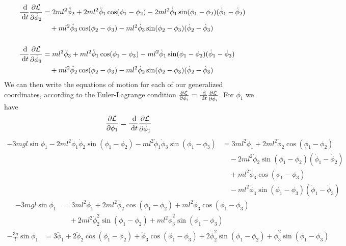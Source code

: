 \documentclass{article}
\renewcommand{\L}{\mathcal{L}}
\begin{document}
\begin{appendices}
\begin{align}
	\D{}{t}\pD{\L}{\dot\phi_2} &= 2ml^2\ddot\phi_2 
		+ 2ml^2\ddot\phi_1\cos(\phi_1-\phi_2) 
		- 2ml^2\dot\phi_1\sin(\phi_1-\phi_2)(\dot\phi_1-\dot\phi_2) \\
		&\quad + ml^2\ddot\phi_3\cos(\phi_2-\phi_3) 
		- ml^2\dot\phi_3\sin(\phi_2-\phi_3)(\dot\phi_2-\dot\phi_3) \\\\
	\D{}{t}\pD{\L}{\dot\phi_3} &= ml^2\ddot\phi_3 
		+ ml^2\ddot\phi_1\cos(\phi_1-\phi_3) 
		- ml^2\dot\phi_1\sin(\phi_1-\phi_3)(\dot\phi_1-\dot\phi_3) \\
		&\quad + ml^2\ddot\phi_2\cos(\phi_2-\phi_3) 
		- ml^2\dot\phi_2\sin(\phi_2-\phi_3)(\dot\phi_2-\dot\phi_3) 
\end{align}
We can then write the equations of motion for each of our generalized
coordinates, according to the Euler-Lagrange condition $\pD{\L}{\phi_i}
=\D{}{t}\pD{\L}{\dot\phi_i}$. For $\phi_1$ we have
\begin{align}
	\pD{\L}{\phi_1} &= \D{}{t}\pD{\L}{\dot\phi_1} 
\end{align}
\begin{align}
	-3mgl\sin\phi_1 -2ml^2\dot\phi_1\dot\phi_2\sin(\phi_1-\phi_2)
		-ml^2\dot\phi_1\dot\phi_3\sin(\phi_1-\phi_3)
	&= 3ml^2\ddot\phi_1 + 2ml^2\ddot\phi_2\cos(\phi_1-\phi_2) \\
	&\quad - 2ml^2\dot\phi_2\sin(\phi_1-\phi_2)(\dot\phi_1-\dot\phi_2) \\
	&\quad + ml^2\ddot\phi_3\cos(\phi_1-\phi_3) \\
	&\quad - ml^2\dot\phi_3\sin(\phi_1-\phi_3)(\dot\phi_1-\dot\phi_3) 
\end{align}
\begin{align}
	-3mgl\sin\phi_1 &= 3ml^2\ddot\phi_1 + 2ml^2\ddot\phi_2\cos(\phi_1-\phi_2)
		+ ml^2\ddot\phi_3\cos(\phi_1-\phi_3)  \\
		&\quad + 2ml^2\dot\phi_2^2\sin(\phi_1-\phi_2)
		+ ml^2\dot\phi_3^2\sin(\phi_1-\phi_3)
\end{align}
\begin{align}
	-\frac{3g}{l}\sin\phi_1 &= 3\ddot\phi_1 + 2\ddot\phi_2\cos(\phi_1-\phi_2)
		+ \ddot\phi_3\cos(\phi_1-\phi_3) + 2\dot\phi_2^2\sin(\phi_1-\phi_2)
		+ \dot\phi_3^2\sin(\phi_1-\phi_3)   \label{eq_m1}
\end{align}


\end{appendices}
\end{document}
